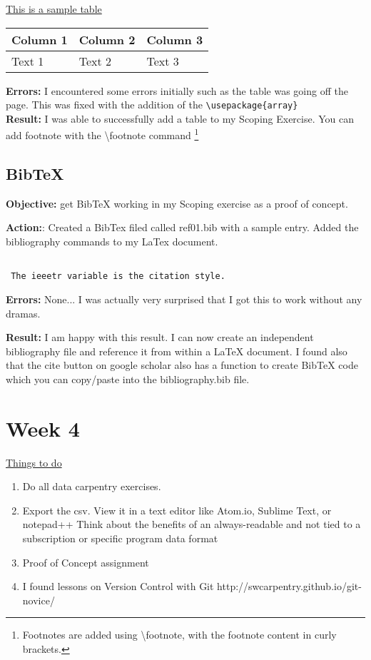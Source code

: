 \documentclass[a4paper,12pt]{article}
\begin{document}
\noindent \underline{This is a sample table}
\begin{center}
\begin{tabular}{ | m{2.5cm} | m{6cm}| m{6cm} | } 
\hline
Column 1 & Column 2 & Column 3 \\ 
\hline
Text 1 & Text 2 & Text 3 \\ 
\hline
\end{tabular}
\end{center}

\noindent \textbf{Errors:}  I encountered some errors initially such as the table was going off the page. This was fixed with the addition of the \verb|\usepackage{array}|\\ 

\noindent \textbf{Result:} I was able to successfully add a table to my Scoping Exercise.
You can add footnote with the \textbackslash footnote command \footnote{Footnotes are added using \textbackslash footnote, with the footnote content in curly brackets.}

\subsection{BibTeX}

\noindent \textbf{Objective:} get BibTeX working in my Scoping exercise as a proof of concept. 

\noindent \textbf{Action:}: Created a BibTex filed called ref01.bib with a sample entry.
Added the bibliography commands to my LaTex document.
\begin{verbatim}

 The ieeetr variable is the citation style. 
\end{verbatim}
\noindent \textbf{Errors:} None... I was actually very surprised that I got this to work without any dramas.

\noindent \textbf{Result:} I am happy with this result. I can now create an independent bibliography file and reference it from within a LaTeX document. I found also that the cite button on google scholar also has a function to create BibTeX code which you can copy/paste into the bibliography.bib file. 

\newpage

\section{Week 4}

\underline {Things to do}

\begin{enumerate}
\item Do all data carpentry exercises.
\item Export the csv. View it in a text editor like Atom.io, Sublime Text, or notepad++ Think about the benefits of an always-readable and not tied to a subscription or specific program data format
\item Proof of Concept assignment 
\item I found lessons on Version Control with Git http://swcarpentry.github.io/git-novice/
\end{enumerate}
\end{document}
